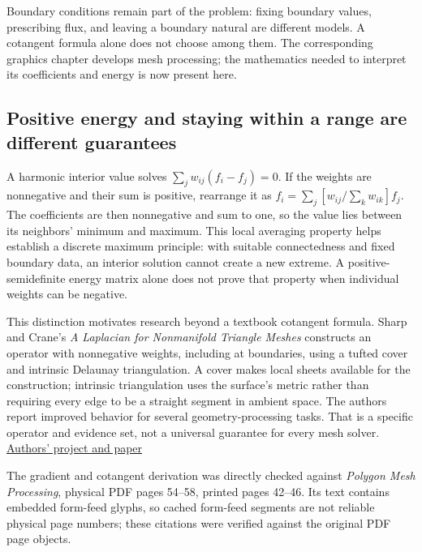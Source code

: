 Boundary conditions remain part of the problem: fixing boundary values, prescribing flux, and leaving a boundary natural are different models. A cotangent formula alone does not choose among them. The corresponding graphics chapter develops mesh processing; the mathematics needed to interpret its coefficients and energy is now present here.

\subsection{Positive energy and staying within a range are different guarantees}\label{02-foundations-ii-ch021-positive-energy-and-staying-within-a-range-are-different-guarantees}

\hypertarget{02-foundations-ii-ch021-positive-energy-and-staying-within-a-range-are-different-guarantees}{}

A harmonic interior value solves \(\sum_jw_{ij}(f_i-f_j)=0\). If the weights are nonnegative and their sum is positive, rearrange it as \(f_i=\sum_j[w_{ij}/\sum_kw_{ik}]f_j\). The coefficients are then nonnegative and sum to one, so the value lies between its neighbors' minimum and maximum. This local averaging property helps establish a discrete maximum principle: with suitable connectedness and fixed boundary data, an interior solution cannot create a new extreme. A positive-semidefinite energy matrix alone does not prove that property when individual weights can be negative.

This distinction motivates research beyond a textbook cotangent formula. Sharp and Crane's \emph{A Laplacian for Nonmanifold Triangle Meshes} constructs an operator with nonnegative weights, including at boundaries, using a tufted cover and intrinsic Delaunay triangulation. A cover makes local sheets available for the construction; intrinsic triangulation uses the surface's metric rather than requiring every edge to be a straight segment in ambient space. The authors report improved behavior for several geometry-processing tasks. That is a specific operator and evidence set, not a universal guarantee for every mesh solver. \href{https://www.cs.cmu.edu/~kmcrane/Projects/NonmanifoldLaplace/index.html}{Authors' project and paper}

The gradient and cotangent derivation was directly checked against \emph{Polygon Mesh Processing}, physical PDF pages 54--58, printed pages 42--46. Its text contains embedded form-feed glyphs, so cached form-feed segments are not reliable physical page numbers; these citations were verified against the original PDF page objects.

